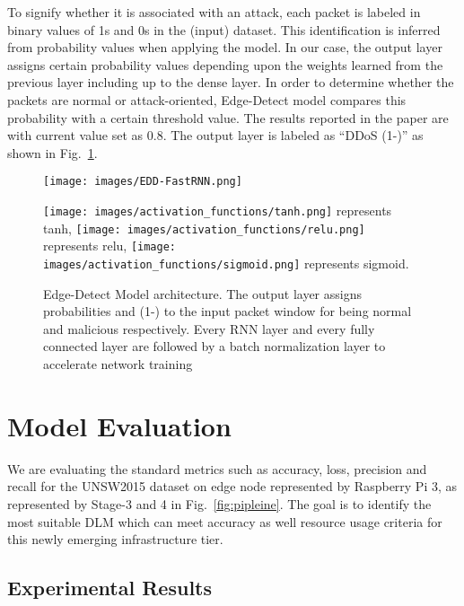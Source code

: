 \documentclass[conference]{IEEEtran}
\begin{document}
To signify whether it is associated with an attack, each packet is labeled in binary values of 1s and 0s in the (input) dataset.
This identification is inferred from probability values when applying the model. 
In our case, the output layer assigns certain probability values depending upon the weights learned from the previous layer including up to the dense layer.
In order to determine whether the packets are normal or attack-oriented, Edge-Detect model compares this probability with a certain threshold value. 
The results reported in the paper are with current value set as 0.8. 
The output layer is labeled as ``DDoS  (1-)'' as shown in Fig.~\ref{fig:edd_network}.
\begin{figure}
    \centering
    \texttt{[image: images/EDD-FastRNN.png]}
        \label{fig:edd-rnn}
    \iffalse
    \subfigure[Edge-Detect model with RNN cells]
    {
        \texttt{[image: images/edd-rnn.png]}
        \label{fig:edd-rnn}
    }
     
     \subfigure[Edge-Detect model with GRNN cells]
    {
        \texttt{[image: images/edd-grnn.png]}
        \label{fig:edd-grnn}
    }
    \fi
    \caption{Edge-Detect Model architecture. The output layer assigns probabilities  and (1-) to the input packet window for being normal and malicious respectively. Every RNN layer and every fully connected layer are followed by a batch normalization layer to accelerate network training}
    \label{fig:edd_network}
    \protect\texttt{[image: images/activation\_functions/tanh.png]} \footnotesize{ represents tanh,}
    \protect\texttt{[image: images/activation\_functions/relu.png]}\footnotesize{ represents relu,}
    \protect\texttt{[image: images/activation\_functions/sigmoid.png]}\footnotesize{ represents sigmoid.}
\end{figure}
\section{Model Evaluation} \label{Sec:Evaluation} 
\noindent We are evaluating the standard metrics such as accuracy, loss, precision and recall for the UNSW2015 dataset on edge node represented by Raspberry Pi 3, as represented by Stage-3 and 4 in Fig.~\ref{fig:pipleine}. The goal is to identify the most suitable DLM which can meet accuracy as well resource usage criteria for this newly emerging infrastructure tier. 
\subsection{Experimental Results}
\end{document}
